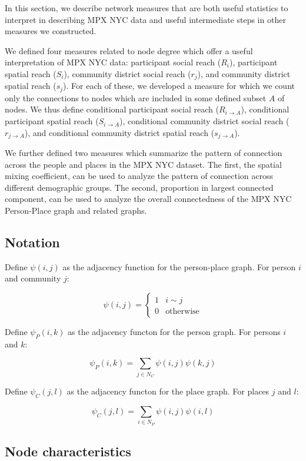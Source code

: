 \documentclass[
  letterpaper,
  DIV=11,
  numbers=noendperiod,
  oneside]{scrreprt}
\begin{document}
In this section, we describe network measures that are both useful
statistics to interpret in describing MPX NYC data and useful
intermediate steps in other measures we constructed.

We defined four measures related to node degree which offer a useful
interpretation of MPX NYC data: participant social reach (\(R_i\)),
participant spatial reach (\(S_i\)), community district social reach
(\(r_j\)), and community district spatial reach (\(s_j\)). For each of
these, we developed a measure for which we count only the connections to
nodes which are included in some defined subset \(A\) of nodes. We thus
define conditional participant social reach (\(R_{i \rightarrow A}\)),
conditional participant spatial reach (\(S_{i \rightarrow A}\)),
conditional community district social reach (\(r_{j \rightarrow A}\)),
and conditional community district spatial reach
(\(s_{j \rightarrow A}\)).

We further defined two measures which summarize the pattern of
connection across the people and places in the MPX NYC dataset. The
first, the spatial mixing coefficient, can be used to analyze the
pattern of connection across different demographic groups. The second,
proportion in largest connected component, can be used to analyze the
overall connectedness of the MPX NYC Person-Place graph and related
graphs.

\hypertarget{notation}{%
\subsection{Notation}\label{notation}}

Define \(\psi(i,j)\) as the adjacency function for the person-place
graph. For person \(i\) and community \(j\):

\[
\psi(i,j) = \begin{cases} 1 &i\sim j \\ 0 &\text{otherwise} \end{cases}
\]

Define \(\psi_P(i,k)\) as the adjacency functon for the person graph.
For persons \(i\) and \(k\):

\[
\psi_P(i,k) = \sum_{j \in N_C}{\psi(i,j) \psi(k,j)}
\]

Define \(\psi_C(j,l)\) as the adjacency functon for the place graph. For
places \(j\) and \(l\):

\[
\psi_C(j,l) = \sum_{i \in N_P}{\psi(i,j) \psi(i,l)}
\]

\hypertarget{node-characteristics-1}{%
\subsection{Node characteristics}\label{node-characteristics-1}}
\end{document}
